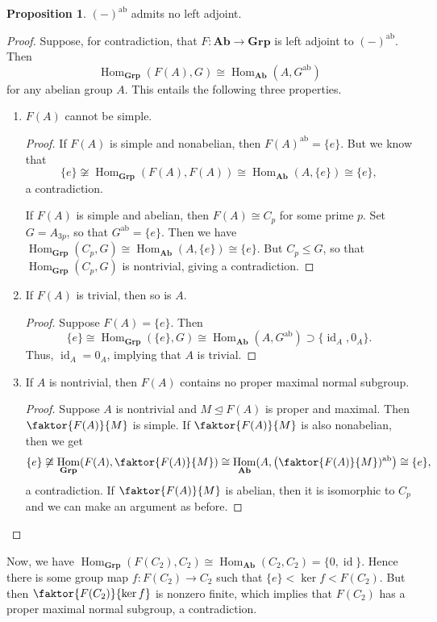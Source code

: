\documentclass[10pt,letterpaper,cm]{nupset}
\theoremstyle{definition}
\newtheorem{prop}{Proposition}
\newcommand{\1}{\mathbf{1}}
\newcommand{\0}{\vec 0}
\DeclareMathOperator{\id}{id}
\DeclareMathOperator{\ab}{ab}
\DeclareMathOperator{\Hom}{Hom}
\begin{document}
\begin{prop}
$(-)^{\ab}$ admits no left adjoint.
\end{prop}
\begin{proof}
Suppose, for contradiction, that $F: \mathbf{Ab} \to \mathbf{Grp}$ is  left adjoint to $(-)^{\ab}$. Then $$\Hom_{\mathbf{Grp}}(F(A), G) \cong \Hom_{\mathbf{Ab}}(A, G^{\ab})$$ for any abelian group $A$. This entails the following three properties.
\begin{enumerate}
\item $F(A)$ cannot be simple.
\begin{proof}
If $F(A)$ is simple and nonabelian, then $F(A)^{\ab} =\{e\}$. But we know that $$\{e\} \not \cong \Hom_{\mathbf{Grp}}(F(A), F(A)) \cong \Hom_{\mathbf{Ab}}(A, \{e\})\cong \{e\},$$ a contradiction.

If $F(A)$ is simple and abelian, then $F(A) \cong C_p$ for some prime $p$. Set $G = A_{3p}$, so that $G^{\ab} = \{e\}$. Then  we have $\Hom_{\mathbf{Grp}}(C_p, G) \cong \Hom_{\mathbf{Ab}}(A, \{e\}) \cong \{e\}.$ But $C_p \leq G$, so that $\Hom_{\mathbf{Grp}}(C_p, G) $ is nontrivial, giving a contradiction. 
\end{proof}
\item If $F(A)$ is trivial, then so is $A$.
\begin{proof}
Suppose $F(A)= \{e\}$. Then $$\{e\} \cong \Hom_{\mathbf{Grp}}(\{e\}, G) \cong \Hom_{\mathbf{Ab}}(A, G^{\ab})\supset \{\id_A, 0_A\}.$$ Thus, $\id_A =0_A$, implying that $A$ is trivial.
\end{proof}
\item If $A$ is nontrivial, then $F(A)$ contains no proper maximal normal subgroup. 
\begin{proof}
Suppose $A$ is nontrivial and $M \unlhd F(A)$ is proper and maximal. Then $\faktor{F(A)}{M}$ is simple. If $\faktor{F(A)}{M}$ is also nonabelian, then we get
$$\{e\} \not \cong \Hom_{\mathbf{Grp}}(F(A), \faktor{F(A)}{M}) \cong \Hom_{\mathbf{Ab}}(A, \big (\faktor{F(A)}{M})^{\ab} \big )\cong \{e\},$$ a contradiction. If $\faktor{F(A)}{M}$ is abelian, then it is isomorphic to $C_p$ and we can make an argument as before.
\end{proof}
\end{enumerate}
\end{proof}
Now, we have $ \Hom_{\mathbf{Grp}}(F(C_2), C_2) \cong \Hom_{\mathbf{Ab}}(C_2, C_2) =\{0, \id\}$.  Hence there is some group map $f : F(C_2) \rightarrow C_2$ such that $\{e\} < \ker f < F(C_2)$. But then $\faktor{F(C_2)}{\ker f}$ is nonzero finite, which implies that $F(C_2)$ has a proper maximal normal subgroup, a contradiction. 
\end{document}
